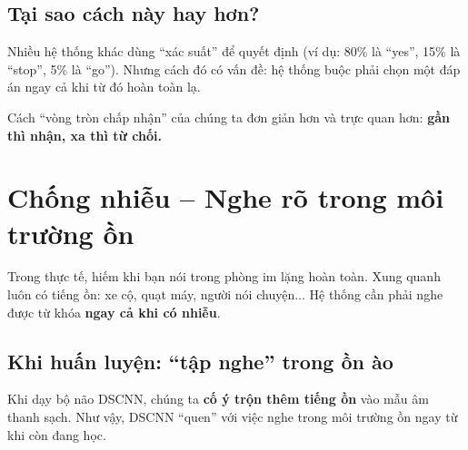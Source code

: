 \documentclass[12pt,a4paper]{article}
\begin{document}
\subsection{Tại sao cách này hay hơn?}

Nhiều hệ thống khác dùng ``xác suất'' để quyết định (ví dụ: 80\% là ``yes'',
15\% là ``stop'', 5\% là ``go''). Nhưng cách đó có vấn đề: hệ thống buộc phải
chọn một đáp án ngay cả khi từ đó hoàn toàn lạ.

Cách ``vòng tròn chấp nhận'' của chúng ta đơn giản hơn và trực quan hơn:
\textbf{gần thì nhận, xa thì từ chối.}


\section{Chống nhiễu -- Nghe rõ trong môi trường ồn}

Trong thực tế, hiếm khi bạn nói trong phòng im lặng hoàn toàn. Xung quanh
luôn có tiếng ồn: xe cộ, quạt máy, người nói chuyện... Hệ thống cần phải
nghe được từ khóa \textbf{ngay cả khi có nhiễu}.

\subsection{Khi huấn luyện: ``tập nghe'' trong ồn ào}

Khi dạy bộ não DSCNN, chúng ta \textbf{cố ý trộn thêm tiếng ồn} vào mẫu
âm thanh sạch. Như vậy, DSCNN ``quen'' với việc nghe trong môi trường ồn
ngay từ khi còn đang học.

\begin{center}
\end{center}
\end{document}
